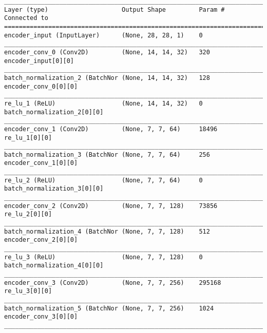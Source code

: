 \begin{lstlisting}[caption={\textsc{Mnist}-VAE-GAN Encoder},captionpos=b,basicstyle=\tiny, label={lst:mnist-vae-encoder}]
__________________________________________________________________________________________________
Layer (type)                    Output Shape         Param #     Connected to
==================================================================================================
encoder_input (InputLayer)      (None, 28, 28, 1)    0
__________________________________________________________________________________________________
encoder_conv_0 (Conv2D)         (None, 14, 14, 32)   320         encoder_input[0][0]
__________________________________________________________________________________________________
batch_normalization_2 (BatchNor (None, 14, 14, 32)   128         encoder_conv_0[0][0]
__________________________________________________________________________________________________
re_lu_1 (ReLU)                  (None, 14, 14, 32)   0           batch_normalization_2[0][0]
__________________________________________________________________________________________________
encoder_conv_1 (Conv2D)         (None, 7, 7, 64)     18496       re_lu_1[0][0]
__________________________________________________________________________________________________
batch_normalization_3 (BatchNor (None, 7, 7, 64)     256         encoder_conv_1[0][0]
__________________________________________________________________________________________________
re_lu_2 (ReLU)                  (None, 7, 7, 64)     0           batch_normalization_3[0][0]
__________________________________________________________________________________________________
encoder_conv_2 (Conv2D)         (None, 7, 7, 128)    73856       re_lu_2[0][0]
__________________________________________________________________________________________________
batch_normalization_4 (BatchNor (None, 7, 7, 128)    512         encoder_conv_2[0][0]
__________________________________________________________________________________________________
re_lu_3 (ReLU)                  (None, 7, 7, 128)    0           batch_normalization_4[0][0]
__________________________________________________________________________________________________
encoder_conv_3 (Conv2D)         (None, 7, 7, 256)    295168      re_lu_3[0][0]
__________________________________________________________________________________________________
batch_normalization_5 (BatchNor (None, 7, 7, 256)    1024        encoder_conv_3[0][0]
__________________________________________________________________________________________________

\end{lstlisting}

